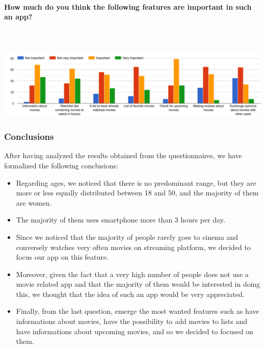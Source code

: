 \documentclass[12pt, a4paper]{article}
\numberwithin{figure}{section}
\begin{document}
\paragraph{How much do you think the following features are important in such an app?}\mbox{}\\\\
\includegraphics[width=1\textwidth]{Images/features.png}\\

\subsubsection{Conclusions}
After having analyzed the results obtained from the questionnaires, we have formalized the following conclusions:
\begin{itemize}
	\item {Regarding ages, we noticed that there is no predominant range, but they
	      are more or less equally distributed between 18 and 50, and the majority
	      of them are women.}
	\item {The majority of them uses smartphone more than 3 hours per day.}
	\item {Since we noticed that the majority of people rarely goes to cinema and
	      conversely watches very often movies on streaming platform, we decided to focus
	      our app on this feature.}
	\item {Moreover, given the fact that a very high number of people does not use
	      a movie related app and that the majority of them would be interested in doing
	      this, we thought that the idea of such an app would be very appreciated.}
	\item {Finally, from the last question, emerge the most wanted features such
	      as have informations about movies, have the possibility to add movies to lists
	      and have informations about upcoming movies, and so we decided to focused on them.}
\end{itemize}



\end{document}
